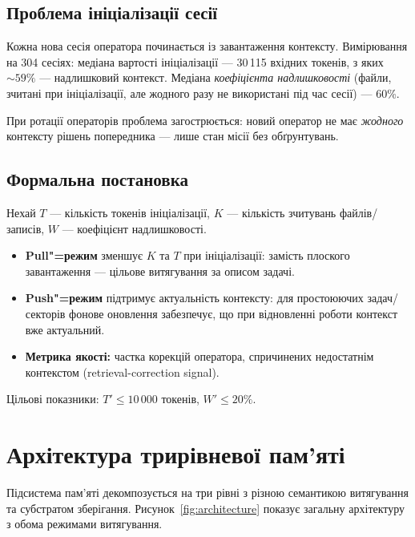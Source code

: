 \documentclass[11pt]{article}
\begin{document}
\subsection{Проблема ініціалізації сесії}

Кожна нова сесія оператора починається із завантаження контексту.
Вимірювання на 304 сесіях: медіана вартості ініціалізації --- 30\,115 вхідних токенів, з яких ${\sim}59\%$ --- надлишковий контекст.
Медіана \emph{коефіцієнта надлишковості} (файли, зчитані при ініціалізації, але жодного разу не використані під час сесії) --- 60\%.

При ротації операторів проблема загострюється: новий оператор не має \emph{жодного} контексту рішень попередника --- лише стан місії без обґрунтувань.

\subsection{Формальна постановка}

Нехай $T$ --- кількість токенів ініціалізації, $K$ --- кількість зчитувань файлів/записів, $W$ --- коефіцієнт надлишковості.
\begin{itemize}[nosep]
  \item \textbf{Pull"=режим} зменшує $K$ та $T$ при ініціалізації: замість плоского завантаження --- цільове витягування за описом задачі.
  \item \textbf{Push"=режим} підтримує актуальність контексту: для простоюючих задач/секторів фонове оновлення забезпечує, що при відновленні роботи контекст вже актуальний.
  \item \textbf{Метрика якості:} частка корекцій оператора, спричинених недостатнім контекстом (retrieval-correction signal).
\end{itemize}

Цільові показники: $T' \leq 10\,000$ токенів, $W' \leq 20\%$.


\section{Архітектура трирівневої пам'яті}
\label{sec:architecture}

Підсистема пам'яті декомпозується на три рівні з різною семантикою витягування та субстратом зберігання.
Рисунок~\ref{fig:architecture} показує загальну архітектуру з обома режимами витягування.
\end{document}
